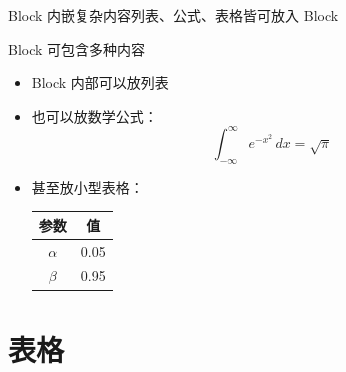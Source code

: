 \documentclass[UTF8,11pt,aspectratio=169]{beamer}
\begin{document}
\begin{frame}{Block 内嵌复杂内容}{列表、公式、表格皆可放入 Block}
    \begin{block}{Block 可包含多种内容}
        \begin{itemize}
            \item Block 内部可以放列表
            \item 也可以放数学公式：
            \[
                \int_{-\infty}^{\infty} e^{-x^2}\,dx = \sqrt{\pi}
            \]
            \item 甚至放小型表格：
            \begin{center}
            \begin{tabular}{c|c}
                \toprule
                参数 & 值 \\
                \midrule
                $\alpha$ & 0.05 \\
                $\beta$  & 0.95 \\
                \bottomrule
            \end{tabular}
            \end{center}
        \end{itemize}
    \end{block}
\end{frame}

\section{表格}
\end{document}
